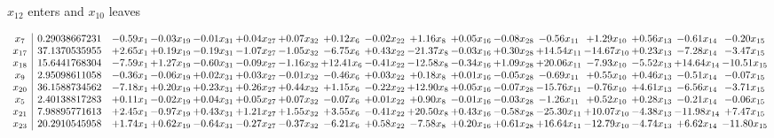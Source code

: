 \documentclass[9pt]{article}
\begin{document}
 $ x_{12} $ enters and $ x_{10} $ leaves 

 \[\begin{array}{c| c c@{\hskip 2pt} c@{\hskip 2pt} c@{\hskip 2pt} c@{\hskip 2pt} c@{\hskip 2pt} c@{\hskip 2pt} c@{\hskip 2pt} c@{\hskip 2pt} c@{\hskip 2pt} c@{\hskip 2pt} c@{\hskip 2pt} c@{\hskip 2pt} c@{\hskip 2pt} c@{\hskip 2pt} c@{\hskip 2pt} }
 x_{7}   &  0.29038667231 & -0.59 x_{1} & -0.03 x_{19} & -0.01 x_{31} & +  0.04 x_{27} & +  0.07 x_{32} & +  0.12 x_{6} & -0.02 x_{22} & +  1.16 x_{8} & +  0.05 x_{16} & -0.08 x_{28} & -0.56 x_{11} & +  1.29 x_{10} & +  0.56 x_{13} & -0.61 x_{14} & -0.20 x_{15}\\
 x_{17}   &  37.1370535955 & +  2.65 x_{1} & +  0.19 x_{19} & -0.19 x_{31} & -1.07 x_{27} & -1.05 x_{32} & -6.75 x_{6} & +  0.43 x_{22} & -21.37 x_{8} & -0.03 x_{16} & +  0.30 x_{28} & + 14.54 x_{11} & -14.67 x_{10} & +  0.23 x_{13} & -7.28 x_{14} & -3.47 x_{15}\\
 x_{18}   &  15.6441768304 & -7.59 x_{1} & +  1.27 x_{19} & -0.60 x_{31} & -0.09 x_{27} & -1.16 x_{32} & + 12.41 x_{6} & -0.41 x_{22} & -12.58 x_{8} & -0.34 x_{16} & +  1.09 x_{28} & + 20.06 x_{11} & -7.93 x_{10} & -5.52 x_{13} & + 14.64 x_{14} & -10.51 x_{15}\\
 x_{9}   &  2.95098611058 & -0.36 x_{1} & -0.06 x_{19} & +  0.02 x_{31} & +  0.03 x_{27} & -0.01 x_{32} & -0.46 x_{6} & +  0.03 x_{22} & +  0.18 x_{8} & +  0.01 x_{16} & -0.05 x_{28} & -0.69 x_{11} & +  0.55 x_{10} & +  0.46 x_{13} & -0.51 x_{14} & -0.07 x_{15}\\
 x_{20}   &  36.1588734562 & -7.18 x_{1} & +  0.20 x_{19} & +  0.23 x_{31} & +  0.26 x_{27} & +  0.44 x_{32} & +  1.15 x_{6} & -0.22 x_{22} & + 12.90 x_{8} & +  0.05 x_{16} & -0.07 x_{28} & -15.76 x_{11} & -0.76 x_{10} & +  4.61 x_{13} & -6.56 x_{14} & -3.71 x_{15}\\
 x_{5}   &  2.40138817283 & +  0.11 x_{1} & -0.02 x_{19} & +  0.04 x_{31} & +  0.05 x_{27} & +  0.07 x_{32} & -0.07 x_{6} & +  0.01 x_{22} & +  0.90 x_{8} & -0.01 x_{16} & -0.03 x_{28} & -1.26 x_{11} & +  0.52 x_{10} & +  0.28 x_{13} & -0.21 x_{14} & -0.06 x_{15}\\
 x_{21}   &  7.98895771613 & +  2.45 x_{1} & -0.97 x_{19} & +  0.43 x_{31} & +  1.21 x_{27} & +  1.55 x_{32} & +  3.55 x_{6} & -0.41 x_{22} & + 20.50 x_{8} & +  0.43 x_{16} & -0.58 x_{28} & -25.30 x_{11} & + 10.07 x_{10} & -4.38 x_{13} & -11.98 x_{14} & +  7.47 x_{15}\\
 x_{23}   &  20.2910545958 & +  1.74 x_{1} & +  0.62 x_{19} & -0.64 x_{31} & -0.27 x_{27} & -0.37 x_{32} & -6.21 x_{6} & +  0.58 x_{22} & -7.58 x_{8} & +  0.20 x_{16} & +  0.61 x_{28} & + 16.64 x_{11} & -12.79 x_{10} & -4.74 x_{13} & +  6.62 x_{14} & -11.80 x_{15}\\

\end{array}\]
\end{document}
